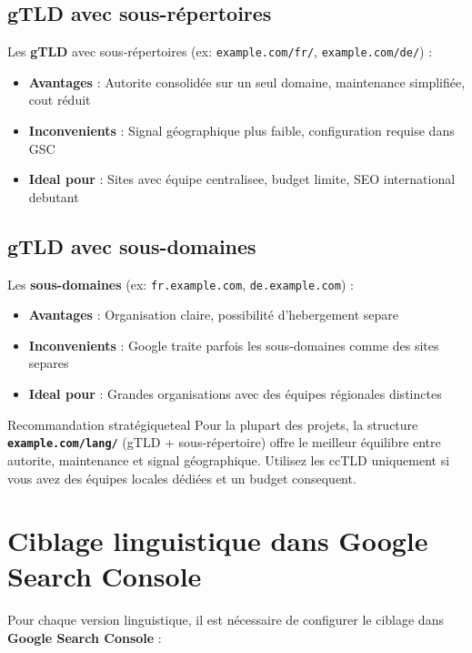 \documentclass[12pt,a4paper,twoside]{report}
\newcommand{\keyword}[1]{\textbf{\textcolor{googleblue}{#1}}}
\newcommand{\important}[1]{\textbf{\textcolor{googlered}{#1}}}
\begin{document}
\subsection{gTLD avec sous-répertoires}

Les \keyword{gTLD} avec sous-répertoires (ex: \texttt{example.com/fr/}, \texttt{example.com/de/}) :

\begin{itemize}
    \item \textbf{Avantages} : Autorite consolidée sur un seul domaine, maintenance simplifiée, cout réduit
    \item \textbf{Inconvenients} : Signal géographique plus faible, configuration requise dans GSC
    \item \textbf{Ideal pour} : Sites avec équipe centralisee, budget limite, SEO international debutant
\end{itemize}

\subsection{gTLD avec sous-domaines}

Les \keyword{sous-domaines} (ex: \texttt{fr.example.com}, \texttt{de.example.com}) :

\begin{itemize}
    \item \textbf{Avantages} : Organisation claire, possibilité d'hebergement separe
    \item \textbf{Inconvenients} : Google traite parfois les sous-domaines comme des sites separes
    \item \textbf{Ideal pour} : Grandes organisations avec des équipes régionales distinctes
\end{itemize}

\begin{mybox}{Recommandation stratégique}{teal}
Pour la plupart des projets, la structure \important{\texttt{example.com/lang/}} (gTLD + sous-répertoire) offre le meilleur équilibre entre autorite, maintenance et signal géographique. Utilisez les ccTLD uniquement si vous avez des équipes locales dédiées et un budget consequent.
\end{mybox}

\section{Ciblage linguistique dans Google Search Console}

Pour chaque version linguistique, il est nécessaire de configurer le ciblage dans \keyword{Google Search Console} :
\end{document}
